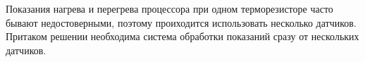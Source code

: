 
Показания нагрева и перегрева процессора при одном терморезисторе 
часто бывают недостоверными, поэтому проиходится использовать несколько
датчиков. Притаком решении необходима система обработки показаний сразу
от нескольких датчиков.

\clearpage

